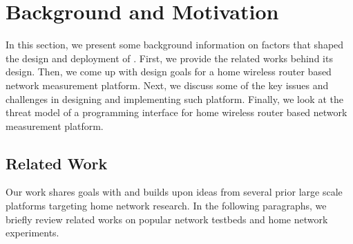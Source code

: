 \chapter{Background and Motivation}
\label{sec.background_motivation}
In this section, we present some background information on factors that shaped the design and deployment of \sysname. First, we provide the related works behind its design. Then, we come up with design goals for a home wireless router based network measurement platform. Next, we discuss some of the key issues and  challenges in designing and implementing such platform. Finally, we look at the threat model of a programming interface for home wireless router based network measurement platform.

\section{Related Work}
\label{ssec.related_work}
Our work shares goals with and builds upon ideas from several prior large scale platforms targeting home network research. In the following paragraphs, we briefly review related works on popular network testbeds and home network experiments. 

